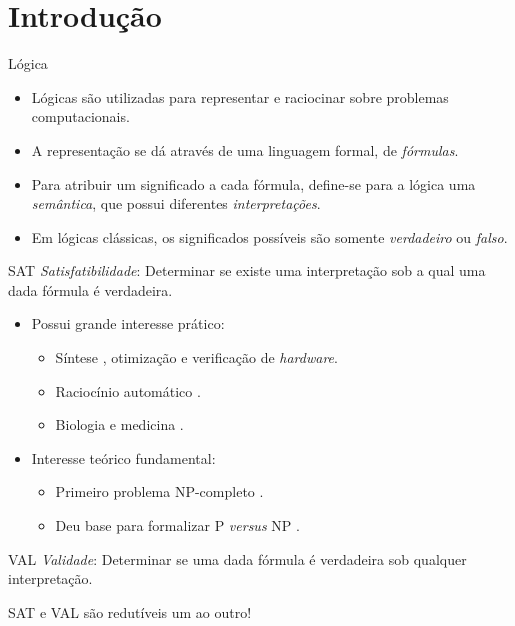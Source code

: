
\section{Introdução}

\begin{frame}{Lógica}
	\begin{itemize}
		\item Lógicas são utilizadas para representar e raciocinar sobre problemas computacionais.
		\pause\item A representação se dá através de uma linguagem formal, de \emph{fórmulas}.
		\pause\item Para atribuir um significado a cada fórmula, define-se para a lógica uma \emph{semântica}\pause, que possui diferentes \emph{interpretações}.
		\pause\item Em lógicas clássicas, os significados possíveis são somente \emph{verdadeiro} ou \emph{falso}.
	\end{itemize}
\end{frame}

\begin{frame}{SAT}
	\emph{Satisfatibilidade}: Determinar se existe uma interpretação sob a qual uma dada fórmula é verdadeira.
	\begin{itemize}
		\pause\item Possui grande interesse prático:
		\begin{itemize}
			\pause\item Síntese \cite{bloem2014sat}, otimização \cite{nieuwenhuis2006sat} e verificação \cite{gupta2006sat} de \textit{hardware}.
			\pause\item Raciocínio automático \cite{harrison2009handbook}.
			\pause\item Biologia e medicina \cite{horvitz1992automated}.
		\end{itemize}
		\pause\item Interesse teórico fundamental:
		\begin{itemize}
			\pause\item Primeiro problema NP-completo \cite{cook1971complexity}.
			\pause\item Deu base para formalizar P \textit{versus} NP \cite{cook1971complexity}.
		\end{itemize}
	\end{itemize}
\end{frame}

\begin{frame}{VAL}
	\emph{Validade}: Determinar se uma dada fórmula é verdadeira sob qualquer interpretação.
	
	\vspace{.5cm}
	\pause SAT e VAL são redutíveis um ao outro!
\end{frame}

